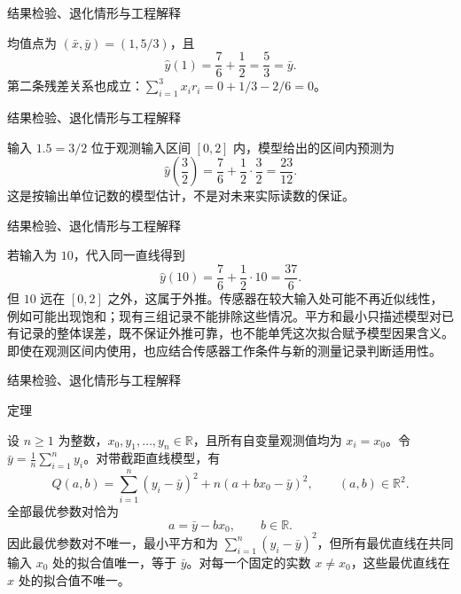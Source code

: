 \documentclass[aspectratio=169,10pt,fontset=fandol]{ctexbeamer}
\begin{document}
\begin{frame}[t,fragile]{结果检验、退化情形与工程解释}
\footnotesize
{\footnotesize
均值点为 $(\bar{x},\bar{y})=(1,5/3)$，且
\[
\hat{y}(1)=\frac76+\frac12=\frac53=\bar{y}.
\]
第二条残差关系也成立：$\sum_{i=1}^{3}x_i r_i=0+1/3-2/6=0$。


}
\end{frame}
\begin{frame}[t,fragile]{结果检验、退化情形与工程解释}
\footnotesize
{\footnotesize
输入 $1.5=3/2$ 位于观测输入区间 $[0,2]$ 内，模型给出的区间内预测为
\[
\hat{y}\left(\frac32\right)=\frac76+\frac12\cdot\frac32
=\frac{23}{12}.
\]
这是按输出单位记数的模型估计，不是对未来实际读数的保证。


}
\end{frame}
\begin{frame}[t,fragile]{结果检验、退化情形与工程解释}
\footnotesize
{\footnotesize
若输入为 $10$，代入同一直线得到
\[
\hat{y}(10)=\frac76+\frac12\cdot10=\frac{37}{6}.
\]
但 $10$ 远在 $[0,2]$ 之外，这属于外推。传感器在较大输入处可能不再近似线性，例如可能出现饱和；现有三组记录不能排除这些情况。平方和最小只描述模型对已有记录的整体误差，既不保证外推可靠，也不能单凭这次拟合赋予模型因果含义。即使在观测区间内使用，也应结合传感器工作条件与新的测量记录判断适用性。\par

}
\end{frame}
\begin{frame}[t,fragile]{结果检验、退化情形与工程解释}
\footnotesize
\begin{block}{定理}
{\footnotesize
设 $n\geq1$ 为整数，$x_0,y_1,\ldots,y_n\in\mathbb{R}$，且所有自变量观测值均为 $x_i=x_0$。令 $\bar{y}=\frac1n\sum_{i=1}^{n}y_i$。对带截距直线模型，有
\[
Q(a,b)=\sum_{i=1}^{n}(y_i-\bar{y})^2+n(a+bx_0-\bar{y})^2,
\qquad (a,b)\in\mathbb{R}^2.
\]
全部最优参数对恰为
\[
a=\bar{y}-bx_0,\qquad b\in\mathbb{R}.
\]
因此最优参数对不唯一，最小平方和为 $\sum_{i=1}^{n}(y_i-\bar{y})^2$，但所有最优直线在共同输入 $x_0$ 处的拟合值唯一，等于 $\bar{y}$。对每一个固定的实数 $x\ne x_0$，这些最优直线在 $x$ 处的拟合值不唯一。

}
\end{block}
\end{frame}
\end{document}
